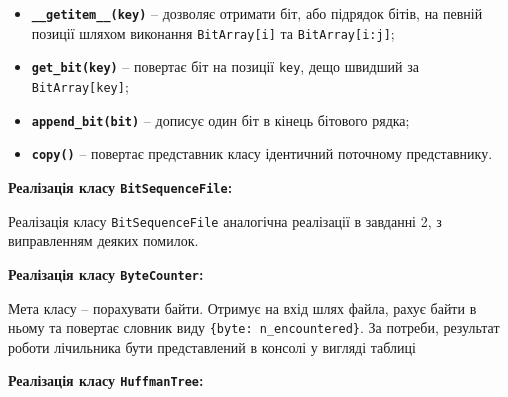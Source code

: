 \documentclass{article}
\def\code#1{\texttt{#1}}
\begin{document}
\begin{itemize}
    \item \textbf{\code{\_\_getitem\_\_(key)}} -- дозволяє отримати біт, або підрядок бітів, на певній позиції шляхом виконання \code{BitArray[i]} та \code{BitArray[i:j]};
    \item \textbf{\code{get\_bit(key)}} -- повертає біт на позиції \code{key}, дещо швидший за \code{BitArray[key]};
    \item \textbf{\code{append\_bit(bit)}} -- дописує один біт в кінець бітового рядка;
    \item \textbf{\code{copy()}} -- повертає представник класу ідентичний поточному представнику.\\\indent
\end{itemize}

\textbf{Реалізація класу \code{BitSequenceFile}:}\\\indent

Реалізація класу \code{BitSequenceFile} аналогічна реалізації в завданні 2, з виправленням деяких помилок.\\\indent

\textbf{Реалізація класу \code{ByteCounter}:}\\\indent

Мета класу -- порахувати байти. Отримує на вхід шлях файла, рахує байти в ньому та повертає словник виду \code{\{byte: n\_encountered\}}. За потреби, результат роботи лічильника бути представлений в консолі у вигляді таблиці

\textbf{Реалізація класу \code{HuffmanTree}:}\\\indent
\end{document}
